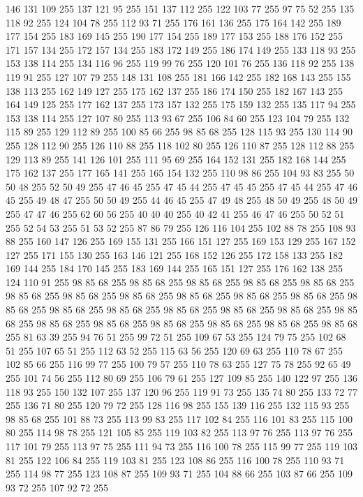 146 131 109 255 137 121 95 255 151 137 112 255 122 103 77 255 97 75 52 255 135 118 92 255 124 104 78 255 112 93 71 255 176 161 136 255 175 164 142 255 189 177 154 255 183 169 145 255 190 177 154 255 189 177 153 255 188 176 152 255 171 157 134 255 172 157 134 255 183 172 149 255 186 174 149 255 133 118 93 255 153 138 114 255 134 116 96 255 119 99 76 255 120 101 76 255 136 118 92 255 138 119 91 255 127 107 79 255 148 131 108 255 181 166 142 255 182 168 143 255 155 138 113 255 162 149 127 255 175 162 137 255 186 174 150 255 182 167 143 255 164 149 125 255 177 162 137 255 173 157 132 255 175 159 132 255 135 117 94 255 153 138 114 255 127 107 80 255 113 93 67 255 106 84 60 255 123 104 79 255 132 115 89 255 129 112 89 255 100 85 66 255 98 85 68 255 128 115 93 255 130 114 90 255 128 112 90 255 126 110 88 255 118 102 80 255 126 110 87 255 128 112 88 255 129 113 89 255 141 126 101 255 111 95 69 255 164 152 131 255 182 168 144 255 175 162 137 255 177 165 141 255 165 154 132 255
110 98 86 255 104 93 83 255 50 50 48 255 52 50 49 255 47 46 45 255 47 45 44 255 47 45 45 255 47 45 44 255 47 46 45 255 49 48 47 255 50 50 49 255 44 46 45 255 47 49 48 255 48 50 49 255 48 50 49 255 47 47 46 255 62 60 56 255 40 40 40 255 40 42 41 255 46 47 46 255 50 52 51 255 52 54 53 255 51 53 52 255 87 86 79 255 126 116 104 255 102 88 78 255 108 93 88 255 160 147 126 255 169 155 131 255 166 151 127 255 169 153 129 255 167 152 127 255 171 155 130 255 163 146 121 255 168 152 126 255 172 158 133 255 182 169 144 255 184 170 145 255 183 169 144 255 165 151 127 255 176 162 138 255 124 110 91 255 98 85 68 255 98 85 68 255 98 85 68 255 98 85 68 255 98 85 68 255 98 85 68 255 98 85 68 255 98 85 68 255 98 85 68 255 98 85 68 255 98 85 68 255 98 85 68 255 98 85 68 255 98 85 68 255 98 85 68 255 98 85 68 255 98 85 68 255 98 85 68 255 98 85 68 255 98 85 68 255 98 85 68 255 98 85 68 255
98 85 68 255 98 85 68 255 81 63 39 255 94 76 51 255 99 72 51 255 109 67 53 255 124 79 75 255 102 68 51 255 107 65 51 255 112 63 52 255 115 63 56 255 120 69 63 255 110 78 67 255 102 85 66 255 116 99 77 255 100 79 57 255 110 78 63 255 127 75 78 255 92 65 49 255 101 74 56 255 112 80 69 255 106 79 61 255 127 109 85 255 140 122 97 255 136 118 93 255 150 132 107 255 137 120 96 255 119 91 73 255 135 74 80 255 133 72 77 255 136 71 80 255 120 79 72 255 128 116 98 255 155 139 116 255 132 115 93 255 98 85 68 255 101 88 73 255 113 99 83 255 117 102 84 255 116 101 83 255 115 100 80 255 114 98 78 255 121 105 85 255 119 103 82 255 113 97 76 255 113 97 76 255 117 101 79 255 113 97 75 255 111 94 73 255 116 100 78 255 115 99 77 255 119 103 81 255 122 106 84 255 119 103 81 255 123 108 86 255 116 100 78 255 110 93 71 255 114 98 77 255 123 108 87 255 109 93 71 255 104 88 66 255 103 87 66 255 109 93 72 255 107 92 72 255
